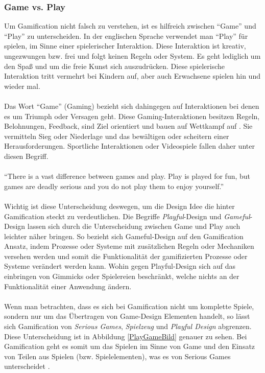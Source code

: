 \documentclass[a4paper,12pt]{scrartcl}
\begin{document}
\subsubsection{Game vs. Play}
Um Gamification nicht falsch zu verstehen, ist es hilfreich zwischen \enquote{Game} und \enquote{Play} zu unterscheiden. In der englischen Sprache verwendet man \enquote{Play} für spielen, im Sinne einer spielerischer Interaktion. Diese Interaktion ist kreativ, ungezwungen bzw. frei und folgt keinen Regeln oder System. Es geht lediglich um den Spaß und um die freie Kunst sich auszudrücken. Diese spielerische Interaktion tritt vermehrt bei Kindern auf, aber auch Erwachsene spielen hin und wieder mal. 
\\\\
Das Wort \enquote{Game} (Gaming) bezieht sich dahingegen auf Interaktionen bei denen es um Triumph oder Versagen geht. Diese Gaming-Interaktionen besitzen Regeln, Belohnungen, Feedback, sind Ziel orientiert und bauen auf Wettkampf auf \cite{Deterding2011}. Sie vermitteln Sieg oder Niederlage und das bewältigen oder scheitern einer Herausforderungen. Sportliche Interaktionen oder Videospiele fallen daher unter diesen Begriff. 
\\\\
\enquote{There is a vast difference between games and play. Play is played for fun, but games are deadly serious and you do not play them to enjoy yourself.}\cite{Baring2014}
\\\\
Wichtig ist diese Unterscheidung deswegen, um die Design Idee die hinter Gamification steckt zu verdeutlichen. Die Begriffe \textit{Playful}-Design und \textit{Gameful}-Design lassen sich durch die Unterscheidung zwischen Game und Play auch leichter näher bringen. So bezieht sich Gameful-Design auf den Gamification Ansatz, indem Prozesse oder Systeme mit zusätzlichen Regeln oder Mechaniken versehen werden und somit die Funktionalität der gamifizierten Prozesse oder Systeme verändert werden kann. Wohin gegen Playful-Design sich auf das einbringen von Gimmicks oder Spielereien beschränkt, welche nichts an der Funktionalität einer Anwendung ändern. 
\\\\
Wenn man betrachten, dass es sich bei Gamification nicht um komplette Spiele, sondern nur um das Übertragen von Game-Design Elementen handelt, so lässt sich Gamification von \textit{Serious Games}, \textit{Spielzeug} und \textit{Playful Design} abgrenzen. Diese Unterscheidung ist in Abbildung \ref{PlayGameBild} genauer zu sehen. Bei Gamification geht es somit um das Spielen im Sinne von Game und den Einsatz von Teilen aus Spielen (bzw. Spielelementen), was es von Serious Games unterscheidet \cite{PlayGame2018}.
\end{document}
